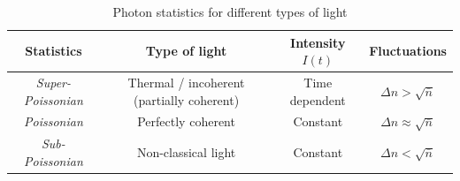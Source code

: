 \begin{table}[H]
\centering
\begin{tabular}{@{}cccc@{}}
\toprule
\textbf{Statistics}       & \textbf{Type of light}                    & \textbf{Intensity $I(t)$} & \textbf{Fluctuations}                  \\ \midrule
\textit{Super-Poissonian} & Thermal / incoherent (partially coherent) & Time dependent            & $\Delta n > \sqrt{\overline{n}}$       \\
\textit{Poissonian}       & Perfectly coherent                        & Constant                  & $\Delta n \approx \sqrt{\overline{n}}$ \\
\textit{Sub-Poissonian}   & Non-classical light                       & Constant                  & $\Delta n < \sqrt{\overline{n}}$       \\ \bottomrule
\end{tabular}
\caption{Photon statistics for different types of light}
\end{table}
